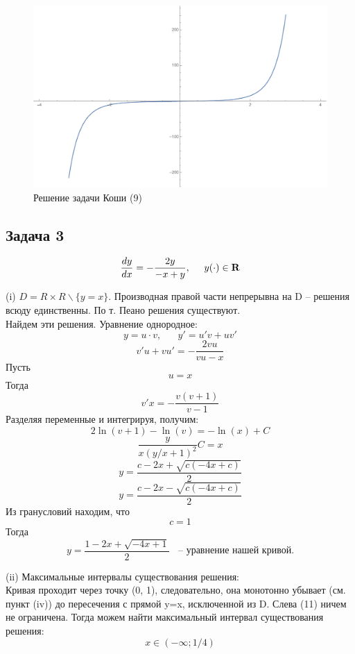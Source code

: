 \documentclass[a4paper, 12pt]{article}
\begin{document}
\begin{figure}[H]
	\centering
	\includegraphics[scale=0.65]{14}
	\caption{Решение задачи Коши (9)}
\end{figure}


		\subsection {Задача 3}


\begin{equation}
\frac {dy}{dx}= - \frac {2y}{-x+y}, \;\;\;\;\; y(\cdot)\in \bf{R}
\end{equation}

(i) $D = R \times R \backslash \{y = x\}$. Производная правой части непрерывна на D -- решения всюду единственны. По т. Пеано решения существуют.\\ 

Найдем эти решения. Уравнение однородное:
\[y = u\cdot v,\;\;\;\;\;\;y'=u'v+uv'\]
\[v'u+vu'= - \frac{2vu}{vu-x}\]
Пусть
\[u = x\]
Тогда 
\[v'x= - \frac {v(v+1)}{v-1}\]
Разделяя переменные и интегрируя, получим:
\[2\ln(v+1)-\ln(v)=-\ln(x)+C\]
\[\frac{y}{x(y/x+1)^2} C= x\]
\[y = \frac {c-2x+\sqrt{c(-4x+c)}}{2}\]
\[y =\frac {c-2x-\sqrt{c(-4x+c)}}{2}\]
Из гранусловий находим, что 
\[c = 1\]
Тогда
\begin{equation}
y =\frac {1-2x+\sqrt{-4x+1}}{2}\;\;\text{ -- уравнение нашей кривой.}
\end{equation}


(ii) Максимальные интервалы существования решения:\\
Кривая проходит через точку (0, 1), следовательно, она монотонно убывает (см. пункт (iv)) до пересечения с прямой y=x, исключенной из D. Слева (11) ничем не ограничена. Тогда можем найти максимальный интервал существования решения: \[x \in (-\infty; 1/4)\]
\end{document}
